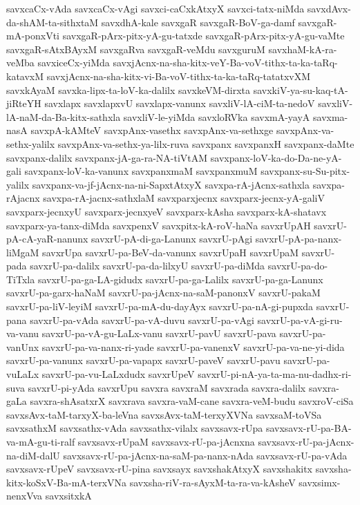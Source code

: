 {savxcaCx-vAda
savxcaCx-vAgi
savxci-caCxkAtxyX
savxci-tatx-niMda
savxdAvx-da-shAM-ta-sithxtaM
savxdhA-kale
savxgaR
savxgaR-BoV-ga-damf
savxgaR-mA-ponxVti
savxgaR-pArx-pitx-yA-gu-tatxde
savxgaR-pArx-pitx-yA-gu-vaMte
savxgaR-sAtxBAyxM
savxgaRva
savxgaR-veMdu
savxguruM
savxhaM-kA-ra-veMba
savxiceCx-yiMda
savxjAcnx-na-sha-kitx-veY-Ba-voV-tithx-ta-ka-taRq-katavxM
savxjAcnx-na-sha-kitx-vi-Ba-voV-tithx-ta-ka-taRq-tatatxvXM
savxkAyaM
savxka-lipx-ta-loV-ka-dalilx
savxkeVM-dirxta
savxkiV-ya-su-kaq-tA-jiRteYH
savxlapx
savxlapxvU
savxlapx-vanunx
savxliV-lA-ciM-ta-nedoV
savxliV-lA-naM-da-Ba-kitx-sathxla
savxliV-le-yiMda
savxloRVka
savxmA-yayA
savxma-nasA
savxpA-kAMteV
savxpAnx-vasethx
savxpAnx-va-sethxge
savxpAnx-va-sethx-yalilx
savxpAnx-va-sethx-ya-lilx-ruva
savxpanx
savxpanxH
savxpanx-daMte
savxpanx-dalilx
savxpanx-jA-ga-ra-NA-tiVtAM
savxpanx-loV-ka-do-Da-ne-yA-gali
savxpanx-loV-ka-vanunx
savxpanxmaM
savxpanxmuM
savxpanx-su-Su-pitx-yalilx
savxpanx-va-jf-jAcnx-na-ni-SapxtAtxyX
savxpa-rA-jAcnx-sathxla
savxpa-rAjacnx
savxpa-rA-jacnx-sathxlaM
savxparxjecnx
savxparx-jecnx-yA-galiV
savxparx-jecnxyU
savxparx-jecnxyeV
savxparx-kAsha
savxparx-kA-shatavx
savxparx-ya-tanx-diMda
savxpenxV
savxpitx-kA-roV-haNa
savxrUpAH
savxrU-pA-cA-yaR-nanunx
savxrU-pA-di-ga-Lanunx
savxrU-pAgi
savxrU-pA-pa-nanx-liMgaM
savxrUpa
savxrU-pa-BeV-da-vanunx
savxrUpaH
savxrUpaM
savxrU-pada
savxrU-pa-dalilx
savxrU-pa-da-lilxyU
savxrU-pa-diMda
savxrU-pa-do-TiTxla
savxrU-pa-ga-LA-gidudx
savxrU-pa-ga-Lalilx
savxrU-pa-ga-Lanunx
savxrU-pa-garx-haNaM
savxrU-pa-jAcnx-na-saM-panonxV
savxrU-pakaM
savxrU-pa-liV-leyiM
savxrU-pa-mA-du-dayAyx
savxrU-pa-nA-gi-pupxda
savxrU-pana
savxrU-pa-vAda
savxrU-pa-vA-duvu
savxrU-pa-vAgi
savxrU-pa-vA-gi-ru-va-vanu
savxrU-pa-vA-gu-LaLx-vanu
savxrU-pavU
savxrU-pava
savxrU-pa-vanUnx
savxrU-pa-va-nanx-ri-yade
savxrU-pa-vanenxV
savxrU-pa-va-ne-yi-dida
savxrU-pa-vanunx
savxrU-pa-vapapx
savxrU-paveV
savxrU-pavu
savxrU-pa-vuLaLx
savxrU-pa-vu-LaLxdudx
savxrUpeV
savxrU-pi-nA-ya-ta-ma-nu-dadhx-ri-suva
savxrU-pi-yAda
savxrUpu
savxra
savxraM
savxrada
savxra-dalilx
savxra-gaLa
savxra-shAsatxrX
savxrava
savxra-vaM-cane
savxra-veM-budu
savxroV-ciSa
savxsAvx-taM-tarxyX-ba-leVna
savxsAvx-taM-terxyXVNa
savxsaM-toVSa
savxsathxM
savxsathx-vAda
savxsathx-vilalx
savxsavx-rUpa
savxsavx-rU-pa-BA-va-mA-gu-ti-ralf
savxsavx-rUpaM
savxsavx-rU-pa-jAcnxna
savxsavx-rU-pa-jAcnx-na-diM-dalU
savxsavx-rU-pa-jAcnx-na-saM-pa-nanx-nAda
savxsavx-rU-pa-vAda
savxsavx-rUpeV
savxsavx-rU-pina
savxsayx
savxshakAtxyX
savxshakitx
savxsha-kitx-koSxV-Ba-mA-terxVNa
savxsha-riV-ra-sAyxM-ta-ra-va-kAsheV
savxsimx-nenxVva
savxsitxkA
}
